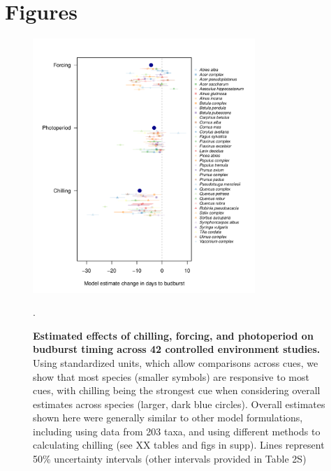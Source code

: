 \documentclass{article}
\begin{document}
\section* {Figures}

\begin{figure}[h!]
\centering
\noindent \includegraphics[width=0.75\textwidth]{..//..//analyses/bb_analysis/figures/muplotspcompexprampfputah_z.pdf}
\caption{\textbf{Estimated effects of chilling, forcing, and photoperiod on budburst timing across 42 controlled environment studies.} Using standardized units, which  allow comparisons across cues, we show that most species (smaller symbols) are responsive to most cues, with chilling being the strongest cue when considering overall estimates across species (larger, dark blue circles). Overall estimates shown here were generally similar to other model formulations, including using data from 203 taxa, and using different methods to calculating chilling (see XX tables and figs in supp). Lines represent 50\% uncertainty intervals (other intervals provided in Table 2S)}.
\label{fig:mu}
\end{figure}

\newpage
\end{document}
